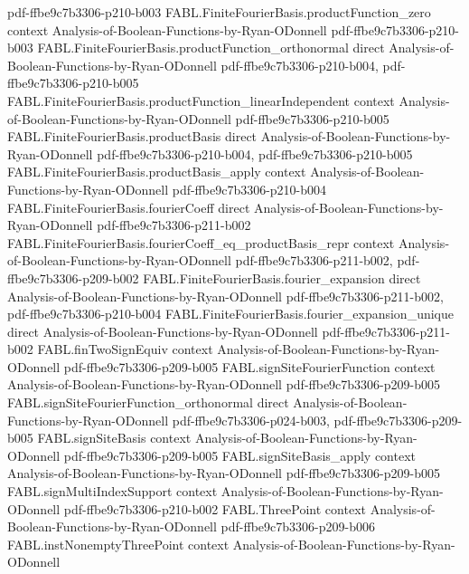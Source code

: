 \begin{theorem}
  {pdf-ffbe9c7b3306-p210-b003}
\proofstep
  {FABL.FiniteFourierBasis.productFunction_zero}
  {context}
  {Analysis-of-Boolean-Functions-by-Ryan-ODonnell}
  {pdf-ffbe9c7b3306-p210-b003}
\proofstep
  {FABL.FiniteFourierBasis.productFunction_orthonormal}
  {direct}
  {Analysis-of-Boolean-Functions-by-Ryan-ODonnell}
  {pdf-ffbe9c7b3306-p210-b004,
    pdf-ffbe9c7b3306-p210-b005}
\proofstep
  {FABL.FiniteFourierBasis.productFunction_linearIndependent}
  {context}
  {Analysis-of-Boolean-Functions-by-Ryan-ODonnell}
  {pdf-ffbe9c7b3306-p210-b005}
\proofstep
  {FABL.FiniteFourierBasis.productBasis}
  {direct}
  {Analysis-of-Boolean-Functions-by-Ryan-ODonnell}
  {pdf-ffbe9c7b3306-p210-b004,
    pdf-ffbe9c7b3306-p210-b005}
\proofstep
  {FABL.FiniteFourierBasis.productBasis_apply}
  {context}
  {Analysis-of-Boolean-Functions-by-Ryan-ODonnell}
  {pdf-ffbe9c7b3306-p210-b004}
\proofstep
  {FABL.FiniteFourierBasis.fourierCoeff}
  {direct}
  {Analysis-of-Boolean-Functions-by-Ryan-ODonnell}
  {pdf-ffbe9c7b3306-p211-b002}
\proofstep
  {FABL.FiniteFourierBasis.fourierCoeff_eq_productBasis_repr}
  {context}
  {Analysis-of-Boolean-Functions-by-Ryan-ODonnell}
  {pdf-ffbe9c7b3306-p211-b002,
    pdf-ffbe9c7b3306-p209-b002}
\proofstep
  {FABL.FiniteFourierBasis.fourier_expansion}
  {direct}
  {Analysis-of-Boolean-Functions-by-Ryan-ODonnell}
  {pdf-ffbe9c7b3306-p211-b002,
    pdf-ffbe9c7b3306-p210-b004}
\proofstep
  {FABL.FiniteFourierBasis.fourier_expansion_unique}
  {direct}
  {Analysis-of-Boolean-Functions-by-Ryan-ODonnell}
  {pdf-ffbe9c7b3306-p211-b002}
\proofstep
  {FABL.finTwoSignEquiv}
  {context}
  {Analysis-of-Boolean-Functions-by-Ryan-ODonnell}
  {pdf-ffbe9c7b3306-p209-b005}
\proofstep
  {FABL.signSiteFourierFunction}
  {context}
  {Analysis-of-Boolean-Functions-by-Ryan-ODonnell}
  {pdf-ffbe9c7b3306-p209-b005}
\proofstep
  {FABL.signSiteFourierFunction_orthonormal}
  {direct}
  {Analysis-of-Boolean-Functions-by-Ryan-ODonnell}
  {pdf-ffbe9c7b3306-p024-b003,
    pdf-ffbe9c7b3306-p209-b005}
\proofstep
  {FABL.signSiteBasis}
  {context}
  {Analysis-of-Boolean-Functions-by-Ryan-ODonnell}
  {pdf-ffbe9c7b3306-p209-b005}
\proofstep
  {FABL.signSiteBasis_apply}
  {context}
  {Analysis-of-Boolean-Functions-by-Ryan-ODonnell}
  {pdf-ffbe9c7b3306-p209-b005}
\proofstep
  {FABL.signMultiIndexSupport}
  {context}
  {Analysis-of-Boolean-Functions-by-Ryan-ODonnell}
  {pdf-ffbe9c7b3306-p210-b002}
\proofstep
  {FABL.ThreePoint}
  {context}
  {Analysis-of-Boolean-Functions-by-Ryan-ODonnell}
  {pdf-ffbe9c7b3306-p209-b006}
\proofstep
  {FABL.instNonemptyThreePoint}
  {context}
  {Analysis-of-Boolean-Functions-by-Ryan-ODonnell}

\end{theorem}
